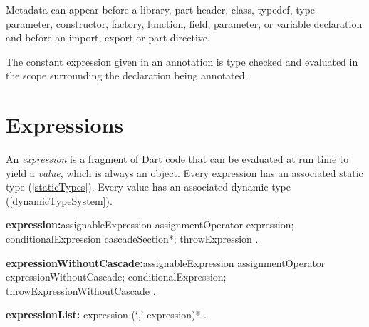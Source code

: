 \documentclass{article}
\begin{document}



\LMHash{}
Metadata can appear before a library, part header, class, typedef, type parameter, constructor, factory, function, field, parameter, or variable declaration and before an import, export or part directive.

\LMHash{}
The constant expression given in an annotation  is type checked and evaluated in the scope surrounding the declaration being annotated.  


\section{Expressions}

\LMHash{}
An {\em expression} is a fragment of Dart code that can be evaluated at run time to yield a {\em value}, which is always an object. Every expression has an associated static type (\ref{staticTypes}). Every value has an associated dynamic type (\ref{dynamicTypeSystem}).


\begin{grammar}

{\bf expression:}assignableExpression assignmentOperator expression;
       conditionalExpression cascadeSection*;
       throwExpression     
    .
     
    
{\bf expressionWithoutCascade:}assignableExpression assignmentOperator expressionWithoutCascade;
      conditionalExpression;
      throwExpressionWithoutCascade    
    .

{\bf expressionList:}
      expression (`,' expression)* %
    .
\end{grammar}    
\end{document}
